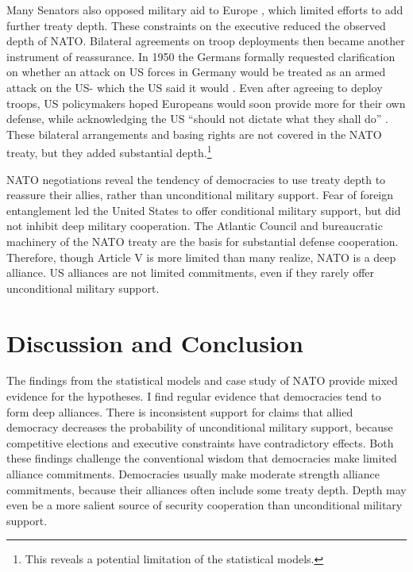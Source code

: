 \documentclass[12pt]{article}
\begin{document}
Many Senators also opposed military aid to Europe \citep[pg 285]{Acheson1969}, which limited efforts to add further treaty depth. 
These constraints on the executive reduced the observed depth of NATO. 
Bilateral agreements on troop deployments then became another instrument of reassurance. 
In 1950 the Germans formally requested clarification on whether an attack on US forces in Germany would be treated as an armed attack on the US- which the US said it would \citep[pg. 395]{Acheson1969}.  
Even after agreeing to deploy troops, US policymakers hoped Europeans would soon provide more for their own defense, while acknowledging the US ``should not dictate what they shall do'' \citep[pg. 2]{Johnson1950}. 
These bilateral arrangements and basing rights are not covered in the NATO treaty, but they added substantial depth.\footnote{This reveals a potential limitation of the statistical models.}  


NATO negotiations reveal the tendency of democracies to use treaty depth to reassure their allies, rather than unconditional military support. 
Fear of foreign entanglement led the United States to offer conditional military support, but did not inhibit deep military cooperation. 
The Atlantic Council and bureaucratic machinery of the NATO treaty are the basis for substantial defense cooperation. 
Therefore, though Article V is more limited than many realize, NATO is a deep alliance. 
US alliances are not limited commitments, even if they rarely offer unconditional military support. 



\section{Discussion and Conclusion}


The findings from the statistical models and case study of NATO provide mixed evidence for the hypotheses. 
I find regular evidence that democracies tend to form deep alliances.
There is inconsistent support for claims that allied democracy decreases the probability of unconditional military support, because competitive elections and executive constraints have contradictory effects. 
Both these findings challenge the conventional wisdom that democracies make limited alliance commitments.
Democracies usually make moderate strength alliance commitments, because their alliances often include some treaty depth. 
Depth may even be a more salient source of security cooperation than unconditional military support. 
\end{document}
